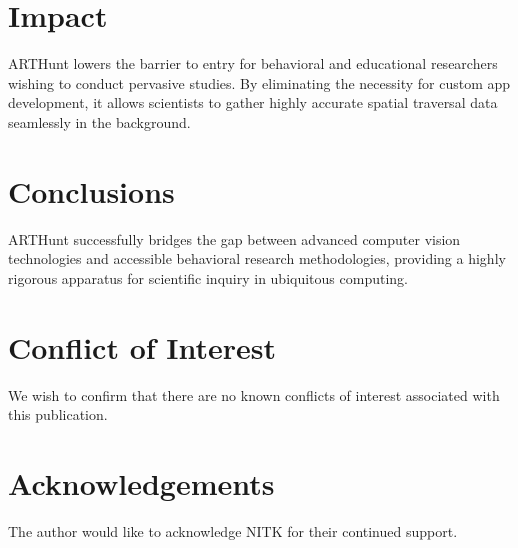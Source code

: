 \documentclass[3p,times]{elsarticle}
\begin{document}
\section{Impact}
\label{sec:impact}
ARTHunt lowers the barrier to entry for behavioral and educational researchers wishing to conduct pervasive studies. By eliminating the necessity for custom app development, it allows scientists to gather highly accurate spatial traversal data seamlessly in the background.

\section{Conclusions}
\label{sec:conclusions}
ARTHunt successfully bridges the gap between advanced computer vision technologies and accessible behavioral research methodologies, providing a highly rigorous apparatus for scientific inquiry in ubiquitous computing.

\section*{Conflict of Interest}
We wish to confirm that there are no known conflicts of interest associated with this publication.

\section*{Acknowledgements}
The author would like to acknowledge NITK for their continued support.


\end{document}
